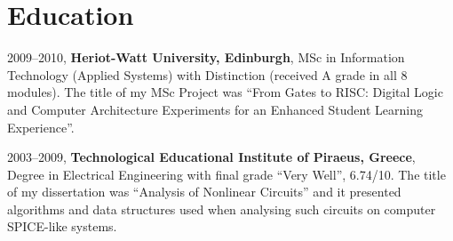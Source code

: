 \documentclass [a4paper,11pt]{article}
\newcommand{\company}[1]{{\textbf{#1}}}
\begin{document}
	\section* {Education}
		\begin {description}
		\parindent=20pt

			\item [2009--2010,] \company{Heriot-Watt University, Edinburgh},
			MSc in Information Technology (Applied Systems) with Distinction
			(received A grade in all 8 modules).  The title of my MSc Project
			was ``From Gates to RISC: Digital Logic and Computer Architecture
			Experiments for an Enhanced Student Learning Experience''.



			\item [2003--2009,] \company{Technological Educational Institute
			of Piraeus, Greece}, Degree in Electrical Engineering with final
			grade ``Very Well'', 6.74/10. The title of my dissertation was
			``Analysis of Nonlinear Circuits'' and it presented algorithms and
			data structures used when analysing such circuits on computer
			SPICE-like systems.

		 \end {description}
	
\end{document}
